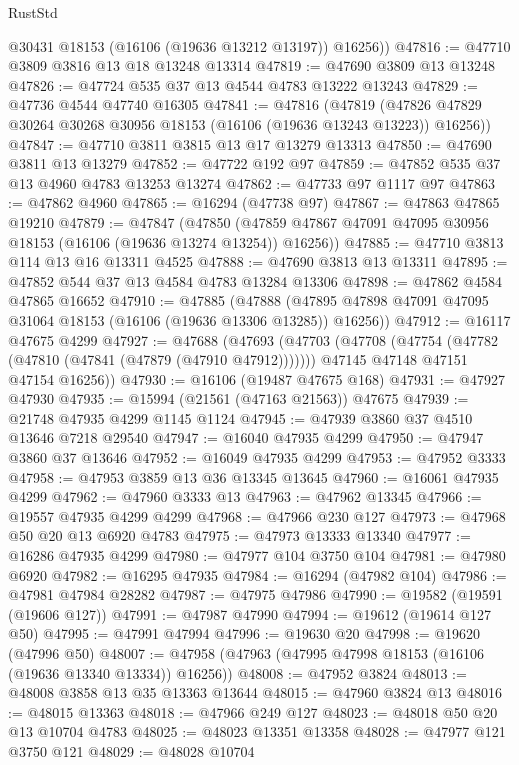 \begin{lexlean}{RustStd}
\begin{coremodule}
        @30431
        @18153
        (@16106 (@19636 @13212 @13197))
        @16256))
@47816 := @47710 @3809 @3816 @13 @18 @13248 @13314
@47819 := @47690 @3809 @13 @13248
@47826 := @47724 @535 @37 @13 @4544 @4783 @13222 @13243
@47829 := @47736 @4544 @47740 @16305
@47841 := @47816
    (@47819 (@47826 @47829 @30264 @30268 @30956 @18153 (@16106 (@19636 @13243 @13223)) @16256))
@47847 := @47710 @3811 @3815 @13 @17 @13279 @13313
@47850 := @47690 @3811 @13 @13279
@47852 := @47722 @192 @97
@47859 := @47852 @535 @37 @13 @4960 @4783 @13253 @13274
@47862 := @47733 @97 @1117 @97
@47863 := @47862 @4960
@47865 := @16294 (@47738 @97)
@47867 := @47863 @47865 @19210
@47879 := @47847
    (@47850 (@47859 @47867 @47091 @47095 @30956 @18153 (@16106 (@19636 @13274 @13254)) @16256))
@47885 := @47710 @3813 @114 @13 @16 @13311 @4525
@47888 := @47690 @3813 @13 @13311
@47895 := @47852 @544 @37 @13 @4584 @4783 @13284 @13306
@47898 := @47862 @4584 @47865 @16652
@47910 := @47885
    (@47888 (@47895 @47898 @47091 @47095 @31064 @18153 (@16106 (@19636 @13306 @13285)) @16256))
@47912 := @16117 @47675 @4299
@47927 := @47688
    (@47693
      (@47703
        (@47708 (@47754 (@47782 (@47810 (@47841 (@47879 (@47910 @47912)))))))
        @47145
        @47148
        @47151
        @47154
        @16256))
@47930 := @16106 (@19487 @47675 @168)
@47931 := @47927 @47930
@47935 := @15994 (@21561 (@47163 @21563)) @47675
@47939 := @21748 @47935 @4299 @1145 @1124
@47945 := @47939 @3860 @37 @4510 @13646 @7218 @29540
@47947 := @16040 @47935 @4299
@47950 := @47947 @3860 @37 @13646
@47952 := @16049 @47935 @4299
@47953 := @47952 @3333
@47958 := @47953 @3859 @13 @36 @13345 @13645
@47960 := @16061 @47935 @4299
@47962 := @47960 @3333 @13
@47963 := @47962 @13345
@47966 := @19557 @47935 @4299 @4299
@47968 := @47966 @230 @127
@47973 := @47968 @50 @20 @13 @6920 @4783
@47975 := @47973 @13333 @13340
@47977 := @16286 @47935 @4299
@47980 := @47977 @104 @3750 @104
@47981 := @47980 @6920
@47982 := @16295 @47935
@47984 := @16294 (@47982 @104)
@47986 := @47981 @47984 @28282
@47987 := @47975 @47986
@47990 := @19582 (@19591 (@19606 @127))
@47991 := @47987 @47990
@47994 := @19612 (@19614 @127 @50)
@47995 := @47991 @47994
@47996 := @19630 @20
@47998 := @19620 (@47996 @50)
@48007 := @47958 (@47963 (@47995 @47998 @18153 (@16106 (@19636 @13340 @13334)) @16256))
@48008 := @47952 @3824
@48013 := @48008 @3858 @13 @35 @13363 @13644
@48015 := @47960 @3824 @13
@48016 := @48015 @13363
@48018 := @47966 @249 @127
@48023 := @48018 @50 @20 @13 @10704 @4783
@48025 := @48023 @13351 @13358
@48028 := @47977 @121 @3750 @121
@48029 := @48028 @10704

\end{coremodule}
\end{lexlean}
